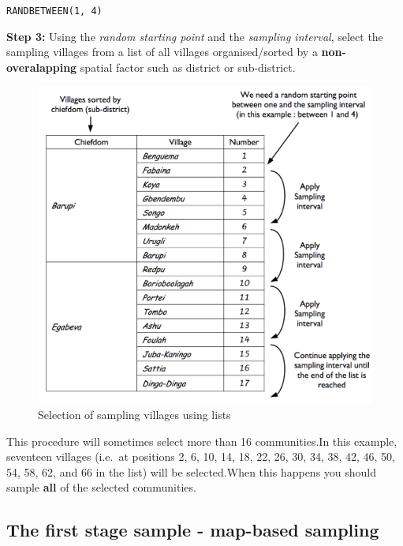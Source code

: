 \documentclass[12pt,a4paper]{book}
\theoremstyle{definition}
\theoremstyle{definition}
\theoremstyle{definition}
\theoremstyle{remark}
\begin{document}
\texttt{RANDBETWEEN(1,\ 4)}

\textbf{Step 3:} Using the \emph{random starting point} and the
\emph{sampling interval}, select the sampling villages from a list of
all villages organised/sorted by a \textbf{non-overalapping} spatial
factor such as district or sub-district.

\begin{figure}[H]

{\centering \includegraphics[width=800pt]{figures/listSample2} 

}

\caption{Selection of sampling villages using lists}\label{fig:sample4}
\end{figure}

This procedure will sometimes select more than 16 communities.In this
example, seventeen villages (i.e.~at positions 2, 6, 10, 14, 18, 22, 26,
30, 34, 38, 42, 46, 50, 54, 58, 62, and 66 in the list) will be
selected.When this happens you should sample \textbf{all} of the
selected communities.

\hypertarget{the-first-stage-sample---map-based-sampling}{%
\subsection{The first stage sample - map-based
sampling}\label{the-first-stage-sample---map-based-sampling}}
\end{document}
